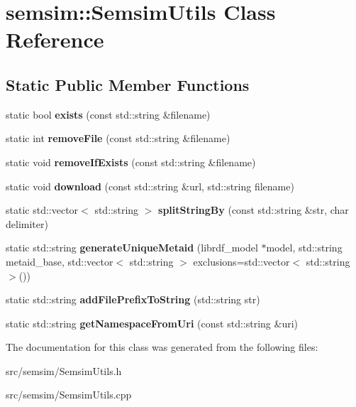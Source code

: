 \hypertarget{classsemsim_1_1SemsimUtils}{}\section{semsim\+:\+:Semsim\+Utils Class Reference}
\label{classsemsim_1_1SemsimUtils}
\subsection*{Static Public Member Functions}
\begin{DoxyCompactItemize}
\item 
\mbox{\label{classsemsim_1_1SemsimUtils_ac8367db330391787072c851985398805}} 
static bool {\bfseries exists} (const std\+::string \&filename)
\item 
\mbox{\label{classsemsim_1_1SemsimUtils_a1693cfd51439a6cc8c1144e82c2e83b3}} 
static int {\bfseries remove\+File} (const std\+::string \&filename)
\item 
\mbox{\label{classsemsim_1_1SemsimUtils_af758a31b9f4de651636587414c071059}} 
static void {\bfseries remove\+If\+Exists} (const std\+::string \&filename)
\item 
\mbox{\label{classsemsim_1_1SemsimUtils_a8eca0e4f3abb89c3577a8e099de8b9ba}} 
static void {\bfseries download} (const std\+::string \&url, std\+::string filename)
\item 
\mbox{\label{classsemsim_1_1SemsimUtils_a07824a843bec362a8b6f7de1154068d5}} 
static std\+::vector$<$ std\+::string $>$ {\bfseries split\+String\+By} (const std\+::string \&str, char delimiter)
\item 
\mbox{\label{classsemsim_1_1SemsimUtils_a24671cf37888fe4b32188bd6759056d9}} 
static std\+::string {\bfseries generate\+Unique\+Metaid} (librdf\+\_\+model $\ast$model, std\+::string metaid\+\_\+base, std\+::vector$<$ std\+::string $>$ exclusions=std\+::vector$<$ std\+::string $>$())
\item 
\mbox{\label{classsemsim_1_1SemsimUtils_aa9435581e7fb3183edad803dbb2f5513}} 
static std\+::string {\bfseries add\+File\+Prefix\+To\+String} (std\+::string str)
\item 
\mbox{\label{classsemsim_1_1SemsimUtils_a05a788ad4fb29a2f583fa1179abc15c0}} 
static std\+::string {\bfseries get\+Namespace\+From\+Uri} (const std\+::string \&uri)
\end{DoxyCompactItemize}


The documentation for this class was generated from the following files\+:\begin{DoxyCompactItemize}
\item 
src/semsim/Semsim\+Utils.\+h\item 
src/semsim/Semsim\+Utils.\+cpp\end{DoxyCompactItemize}
